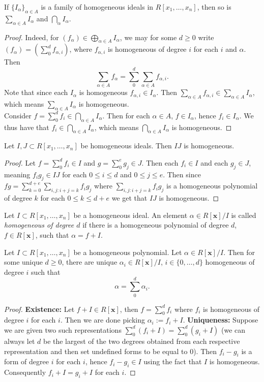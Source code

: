 \begin{lemma}
    If $\{I_\alpha\}_{\alpha\in A}$ is a family of homogeneous ideals in $R[x_1,\dots,x_n]$, then so is $\sum_{\alpha\in A} I_\alpha$ and $\bigcap_{\alpha} I_\alpha$.  
\end{lemma}
\begin{proof}
    Indeed, for $(f_\alpha)\in \bigoplus_{\alpha\in A} I_\alpha$, we may for some $d\geq 0$ write $(f_\alpha)=(\sum_0^d f_{\alpha,i})$, where $f_{\alpha,i}$ is homogeneous of degree $i$ for each $i$ and $\alpha$. Then 
    $$\sum_{\alpha\in A} f_\alpha = \sum_0^d \sum_{\alpha\in A} f_{\alpha,i}.$$
    Note that since each $I_\alpha$ is homogeneous $f_{\alpha,i}\in I_\alpha$. Then $\sum_{\alpha\in A} f_{\alpha,i}\in \sum_{\alpha\in A} I_\alpha$, which means $\sum_{\alpha\in A} I_\alpha$ is homogeneous.\\
    Consider $f=\sum_0^d f_i\in \bigcap_{\alpha\in A} I_\alpha$. Then for each $\alpha \in A$, $f\in I_\alpha$, hence $f_i\in I_\alpha$. We thus have that $f_i\in \bigcap_{\alpha\in A} I_\alpha$, which means $\bigcap_{\alpha \in A} I_\alpha$ is homogeneous.   
\end{proof}
\begin{lemma}
    Let $I,J\subset R[x_1,\dots,x_n]$ be homogeneous ideals. Then $IJ$ is homogeneous.
\end{lemma}
\begin{proof}
    Let $f=\sum_0^d f_i\in I$ and $g=\sum_0^e g_j\in J$. Then each $f_i\in I$ and each $g_j\in J$, meaning $f_ig_j\in IJ$ for each $0\leq i\leq d$ and $0\leq j\leq e$. Then since $fg = \sum_{k=0}^{d+e}\sum_{i,j:i+j= k} f_ig_j$ where $\sum_{i,j:i+j= k} f_ig_j$ is a homogeneous polynomial of degree $k$ for each $0\leq k\leq d+e$ we get that $IJ$ is homogeneous.
\end{proof}
\begin{definition}
    Let $I\subset R[x_1,\dots,x_n]$ be a homogeneous ideal. An element $\alpha\in R[\mathbf{x}]/I$ is called \textit{homogeneous of degree $d$} if there is a homogeneous polynomial of degree $d$, $f\in R[\mathbf{x}]$, such that $\alpha = f + I$. 
\end{definition}
\begin{lemma}
    Let $I\subset R[x_1,\dots,x_n]$ be a homogeneous polynomial. Let $\alpha \in R[\mathbf{x}]/I$. Then for some unique $d\geq 0$, there are unique $\alpha_i\in R[\mathbf{x}]/I$, $i\in\{0,\dots,d\}$ homogeneous of degree $i$ such that 
    $$\alpha = \sum_0^d \alpha_i.$$
\end{lemma}
\begin{proof}
    \textbf{Existence:} Let $f+I\in R[\mathbf{x}]$, then $f = \sum_0^d f_i$ where $f_i$ is homogeneous of degree $i$ for each $i$. Then we are done picking $\alpha_i := f_i+ I$.
    \textbf{Uniqueness:} Suppose we are given two such representations $\sum_0^d (f_i+I) = \sum_0^d (g_i +I)$ (we can always let $d$ be the largest of the two degrees obtained from each respective representation and then set undefined forms to be equal to $0$). Then $f_i-g_i$ is a form of degree $i$ for each $i$, hence $f_i-g_i\in I$ using the fact that $I$ is homogeneous. Consequently $f_i+I=g_i+I$ for each $i$. 
\end{proof}
